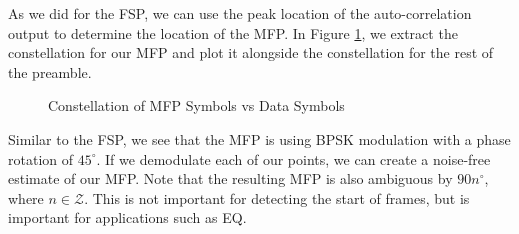 \documentclass[conference,onecolumn]{IEEEtran}
\begin{document}
\noindent As we did for the FSP, we can use the peak location of the auto-correlation output to determine the location of the MFP. In Figure \ref{fig::mfp_constellation}, we extract the constellation for our MFP and plot it alongside the constellation for the rest of the preamble.

\begin{figure}[H]
	\centerline{}
	\caption{Constellation of MFP Symbols vs Data Symbols}
	\label{fig::mfp_constellation}
\end{figure}

\noindent Similar to the FSP, we see that the MFP is using BPSK modulation with a phase rotation of $45^{\circ}$. If we demodulate each of our points, we can create a noise-free estimate of our MFP. Note that the resulting MFP is also ambiguous by $90n^{\circ}$, where $n \in \mathcal{Z}$. This is not important for detecting the start of frames, but is important for applications such as EQ.



\end{document}
